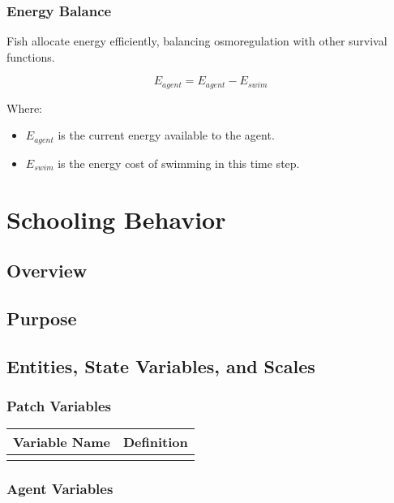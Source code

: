 \documentclass[
]{book}
\providecommand{\tightlist}{%
  \setlength{\itemsep}{0pt}\setlength{\parskip}{0pt}}
\begin{document}
\subsection{Energy Balance}\label{energy-balance-2}

Fish allocate energy efficiently, balancing osmoregulation with other survival functions.

\[ E_{agent} = E_{agent} - E_{swim} \]

Where:

\begin{itemize}
\tightlist
\item
  \(E_{agent}\) is the current energy available to the agent.
\item
  \(E_{swim}\) is the energy cost of swimming in this time step.
\end{itemize}

\chapter{Schooling Behavior}\label{schooling-behavior}

\section{Overview}\label{overview-5}

\section{Purpose}\label{purpose-4}

\section{Entities, State Variables, and Scales}\label{entities-state-variables-and-scales-4}

\subsection{Patch Variables}\label{patch-variables-4}

\begin{longtable}[]{@{}ll@{}}
\toprule\noalign{}
Variable Name & Definition \\
\midrule\noalign{}
\endhead
\bottomrule\noalign{}
\endlastfoot
& \\
\end{longtable}

\subsection{Agent Variables}\label{agent-variables-4}
\end{document}
